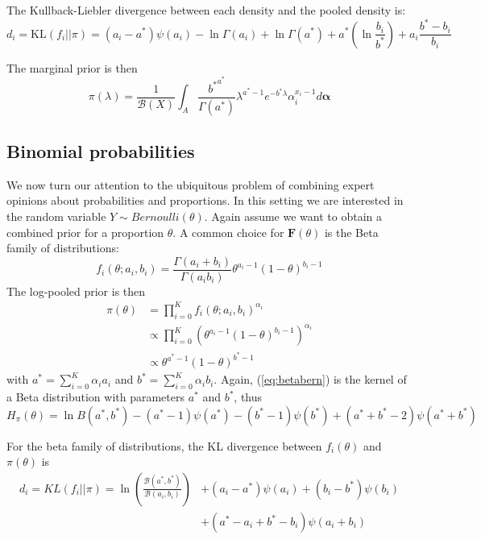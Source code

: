 \documentclass[a4paper, notitlepage, 10pt]{article}
\begin{document}
The Kullback-Liebler divergence between each density and the pooled density is:
\begin{equation}
 \label{eq:KLgamma}
 d_i = \text{KL}(f_i||\pi) = (a_i-a^*)\psi(a_i) - \ln\Gamma(a_i) + \ln\Gamma(a^*) + a^*(\ln\frac{b_i}{b^*}) + a_i\frac{b^*-b_i}{b_i}
\end{equation}

The marginal prior is then
\begin{equation}
\label{eq:marginalgamma}
\pi(\lambda) = \frac{1}{\mathcal{B}(X)}\int_{A} \frac{{b^*}^{a^*}}{\Gamma(a^*)}\lambda^{a^* - 1} e^{-b^*\lambda} \alpha_i^{x_i-1}d\boldsymbol\alpha 
\end{equation}

\subsection*{Binomial probabilities}

We now turn our attention to the ubiquitous problem of combining expert opinions about probabilities and proportions.
In this setting we are interested in the random variable $Y\sim Bernoulli(\theta)$.
Again assume we want to obtain a combined prior for a proportion $\theta$.
A common choice for $\mathbf{F}(\theta)$ is the Beta family of distributions:
$$f_i(\theta;a_i, b_i) = \frac{\Gamma(a_i + b_i)}{\Gamma(a_i b_i)} \theta^{a_i-1}(1-\theta)^{b_i-1}$$
The log-pooled prior is then
\begin{align}
\pi(\theta)&=\prod_{i=0}^{K}f_i(\theta;a_i,b_i)^{\alpha_i}\\
&\propto \prod_{i=0}^{K} \left(\theta^{a_i-1}(1-\theta)^{b_i-1} \right)^{\alpha_i}\\
\label{eq:betabern}
&\propto \theta^{a^*-1}(1-\theta)^{b^*-1}
\end{align}
with $a^* =\sum_{i=0}^{K}\alpha_ia_i$ and $b^* = \sum_{i=0}^{K}\alpha_ib_i$.
Again, (\ref{eq:betabern}) is the kernel of a Beta distribution with parameters $a^*$ and $b^*$, thus 
\begin{equation}
 \label{eq:entropybeta}
 H_{\pi}(\theta) = \ln B(a^*,b^*) - (a^*-1)\psi(a^*) - (b^*-1)\psi(b^*) + (a^*+b^* -2)\psi(a^*+b^*)
\end{equation}

For the beta family of distributions, the KL divergence between $f_i(\theta)$ and $\pi(\theta)$ is
\begin{equation}
\begin{split}
 \label{eq:KLbeta}
 d_i = KL(f_i||\pi) = \ln\left(\frac{\mathcal{B}(a^*, b^*)}{\mathcal{B}(a_i, b_i)}\right) &+ (a_i-a^*)\psi(a_i)+ (b_i-b^*)\psi(b_i) \\
 &+ (a^*-a_i + b^* - b_i)\psi(a_i+b_i)
\end{split}
 \end{equation}
\end{document}

